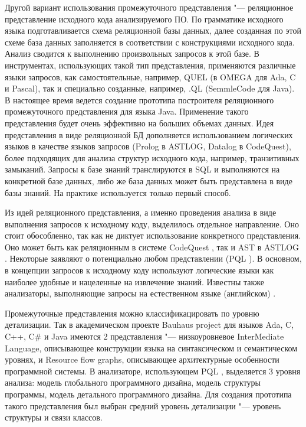 \documentclass[10pt, a5paper]{article}
\begin{document}
Другой вариант использования промежуточного представления "--- реляционное представление исходного кода анализируемого ПО. По грамматике исходного языка подготавливается схема реляционной базы данных, далее созданная по этой схеме база данных заполняется в соответствии с конструкциями исходного кода. Анализ сводится к выполнению произвольных запросов к этой базе. В инструментах, использующих такой тип представления, применяются различные языки запросов, как самостоятельные, например, QUEL \cite{Zubov9} (в OMEGA \cite{Zubov10} для Ada, C и Pascal), так и специально созданные, например, .QL \cite{Zubov11} (SemmleCode \cite{Zubov12} для Java). В настоящее время ведется создание прототипа построителя реляционного промежуточного представления для языка Java. Применение такого представления будет очень эффективно на больших объемах данных. Идея представления в виде реляционной БД дополняется использованием логических языков в качестве языков запросов (Prolog в ASTLOG\cite{Zubov13}, Datalog в CodeQuest\cite{Zubov14}), более подходящих для анализа структур исходного кода, например, транзитивных замыканий. Запросы к базе знаний транслируются в SQL и выполняются на конкретной базе данных, либо же база данных может быть представлена в виде базы знаний. На практике используется только первый способ.

Из идей реляционного представления, а именно проведения анализа в виде выполнения запросов к исходному коду, выделилось отдельное направление. Оно стоит обособленно, так как не диктует использование конкретного представления. Оно может быть как реляционным в системе CodeQuest \cite{Zubov14}, так и AST в ASTLOG \cite{Zubov13}. Некоторые заявляют о потенциально любом представлении (PQL \cite{Zubov15}). В основном, в концепции запросов к исходному коду используют логические языки как наиболее удобные и нацеленные на извлечение знаний. Известны также анализаторы, выполняющие запросы на естественном языке (английском) \cite{Zubov16}.

Промежуточные представления можно классификацировать по уровню детализации. Так в академическом проекте Bauhaus project \cite{Zubov17} для языков Ada, C, C++, C\# и Java имеются 2 представления "--- низкоуровневое InterMediate Language, описывающее конструкции языка на синтаксическом и семантическом уровнях, и Resource flow graphs, описывающее архитектурные особенности программной системы. В анализаторе, использующем PQL \cite{Zubov15}, выделяется 3 уровня анализа: модель глобального программного дизайна, модель структуры программы, модель детального программного дизайна. Для создания прототипа такого представления был выбран средний уровень детализации "--- уровень структуры и связи классов.
\end{document}
